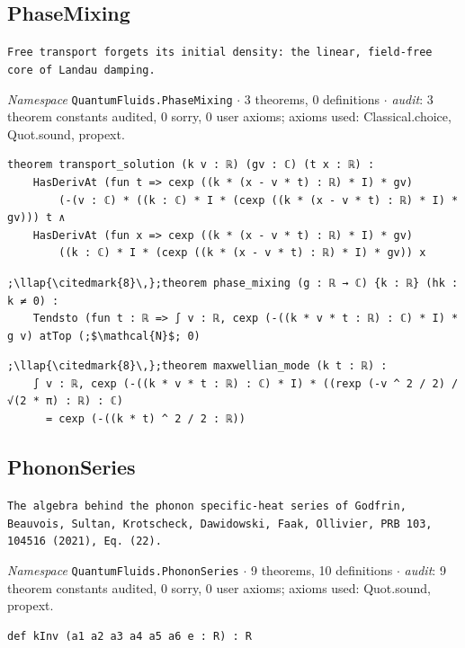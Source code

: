 \subsection{PhaseMixing}\label{appA:PhaseMixing}
{\footnotesize\raggedright\texttt{Free transport forgets its initial density: the linear,\allowbreak{} field-\allowbreak{}free core of Landau damping.\allowbreak{}}\par}
{\footnotesize\raggedright\emph{Namespace} \texttt{QuantumFluids.\allowbreak{}PhaseMixing} $\cdot$ 3 theorems, 0 definitions $\cdot$ \emph{audit}: 3 theorem constants audited, 0 sorry, 0 user axioms; axioms used: Classical.choice, Quot.sound, propext.\par}
\vspace{1pt}
\begin{lstlisting}[style=leancat]
theorem transport_solution (k v : ℝ) (gv : ℂ) (t x : ℝ) :
    HasDerivAt (fun t => cexp ((k * (x - v * t) : ℝ) * I) * gv)
        (-(v : ℂ) * ((k : ℂ) * I * (cexp ((k * (x - v * t) : ℝ) * I) * gv))) t ∧
    HasDerivAt (fun x => cexp ((k * (x - v * t) : ℝ) * I) * gv)
        ((k : ℂ) * I * (cexp ((k * (x - v * t) : ℝ) * I) * gv)) x
\end{lstlisting}

\begin{lstlisting}[style=leancat]
;\llap{\citedmark{8}\,};theorem phase_mixing (g : ℝ → ℂ) {k : ℝ} (hk : k ≠ 0) :
    Tendsto (fun t : ℝ => ∫ v : ℝ, cexp (-((k * v * t : ℝ) : ℂ) * I) * g v) atTop (;$\mathcal{N}$; 0)
\end{lstlisting}

\begin{lstlisting}[style=leancat]
;\llap{\citedmark{8}\,};theorem maxwellian_mode (k t : ℝ) :
    ∫ v : ℝ, cexp (-((k * v * t : ℝ) : ℂ) * I) * ((rexp (-v ^ 2 / 2) / √(2 * π) : ℝ) : ℂ)
      = cexp (-((k * t) ^ 2 / 2 : ℝ))
\end{lstlisting}

\subsection{PhononSeries}\label{appA:PhononSeries}
{\footnotesize\raggedright\texttt{The algebra behind the phonon specific-\allowbreak{}heat series of Godfrin,\allowbreak{} Beauvois,\allowbreak{} Sultan,\allowbreak{} Krotscheck,\allowbreak{} Dawidowski,\allowbreak{} Faak,\allowbreak{} Ollivier,\allowbreak{} PRB 103,\allowbreak{} 104516 (2021),\allowbreak{} Eq.\allowbreak{} (22).\allowbreak{}}\par}
{\footnotesize\raggedright\emph{Namespace} \texttt{QuantumFluids.\allowbreak{}PhononSeries} $\cdot$ 9 theorems, 10 definitions $\cdot$ \emph{audit}: 9 theorem constants audited, 0 sorry, 0 user axioms; axioms used: Quot.sound, propext.\par}
\vspace{1pt}
\begin{lstlisting}[style=leancat]
def kInv (a1 a2 a3 a4 a5 a6 e : R) : R
\end{lstlisting}

